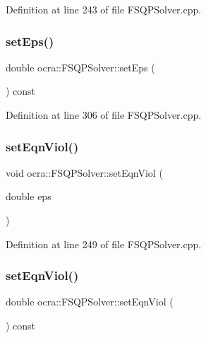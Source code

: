 Definition at line 243 of file F\+S\+Q\+P\+Solver.\+cpp.

\hypertarget{classocra_1_1FSQPSolver_a47b2d328e1407acd9c9fabe0c361592c}{}\label{classocra_1_1FSQPSolver_a47b2d328e1407acd9c9fabe0c361592c} 
\subsubsection{\texorpdfstring{set\+Eps()}{setEps()}\hspace{0.1cm}{\footnotesize\ttfamily [2/2]}}
{\footnotesize\ttfamily double ocra\+::\+F\+S\+Q\+P\+Solver\+::set\+Eps (\begin{DoxyParamCaption}{ }\end{DoxyParamCaption}) const}



Definition at line 306 of file F\+S\+Q\+P\+Solver.\+cpp.

\hypertarget{classocra_1_1FSQPSolver_a734027ea08acaa0d3b1b1b0b6ee9a12d}{}\label{classocra_1_1FSQPSolver_a734027ea08acaa0d3b1b1b0b6ee9a12d} 
\subsubsection{\texorpdfstring{set\+Eqn\+Viol()}{setEqnViol()}\hspace{0.1cm}{\footnotesize\ttfamily [1/2]}}
{\footnotesize\ttfamily void ocra\+::\+F\+S\+Q\+P\+Solver\+::set\+Eqn\+Viol (\begin{DoxyParamCaption}\item[{double}]{eps }\end{DoxyParamCaption})}



Definition at line 249 of file F\+S\+Q\+P\+Solver.\+cpp.

\hypertarget{classocra_1_1FSQPSolver_a667a47f3565538d614750a07dc6d2ed9}{}\label{classocra_1_1FSQPSolver_a667a47f3565538d614750a07dc6d2ed9} 
\subsubsection{\texorpdfstring{set\+Eqn\+Viol()}{setEqnViol()}\hspace{0.1cm}{\footnotesize\ttfamily [2/2]}}
{\footnotesize\ttfamily double ocra\+::\+F\+S\+Q\+P\+Solver\+::set\+Eqn\+Viol (\begin{DoxyParamCaption}{ }\end{DoxyParamCaption}) const}



